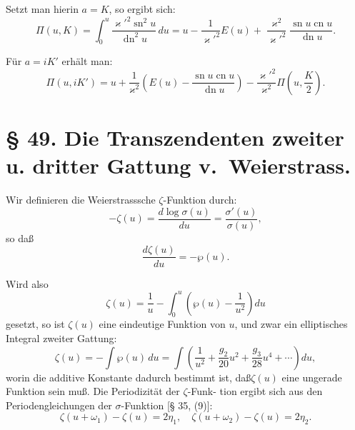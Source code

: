 \documentclass[12pt,a4paper]{article}
\theoremstyle{definition}
\begin{document}
Setzt man hierin $a = K$, so ergibt sich:
\begin{equation}\tag{8}
\Pi(u, K) = \int_0^u \frac{\varkappa'^2 \operatorname{sn}^2 u}{\operatorname{dn}^2 u} \, du = u - \frac{1}{\varkappa'^2}E(u) + \frac{\varkappa^2}{\varkappa'^2}\frac{\operatorname{sn} u \operatorname{cn} u}{\operatorname{dn} u}.
\end{equation}

F\"{u}r $a = iK'$ erh\"{a}lt man:
\begin{equation}\tag{9}
\Pi(u, iK') = u + \frac{1}{\varkappa^2}\left(E(u) - \frac{\operatorname{sn} u \operatorname{cn} u}{\operatorname{dn} u}\right) - \frac{\varkappa'^2}{\varkappa^2}\Pi\left(u, \frac{K}{2}\right).
\end{equation}

\section*{\S{} 49. Die Transzendenten zweiter u. dritter Gattung v.~Weierstrass.}

Wir definieren die Weierstrasssche $\zeta$-Funktion durch:
\begin{equation}\tag{1}
-\zeta(u) = \frac{d\log\sigma(u)}{du} = \frac{\sigma'(u)}{\sigma(u)},
\end{equation}
so da\ss
\begin{equation}\tag{2}
\frac{d\zeta(u)}{du} = -\wp(u).
\end{equation}

Wird also
\begin{equation}\tag{3}
\zeta(u) = \frac{1}{u} - \int_0^u \left(\wp(u) - \frac{1}{u^2}\right) du
\end{equation}
gesetzt, so ist $\zeta(u)$ eine eindeutige Funktion von $u$, und zwar ein
elliptisches Integral zweiter Gattung:
\begin{equation}\tag{4}
\zeta(u) = -\int \wp(u) \, du = \int \left(\frac{1}{u^2} + \frac{g_2}{20}u^2 + \frac{g_3}{28}u^4 + \cdots\right) du,
\end{equation}
worin die additive Konstante dadurch bestimmt ist, da\ss $\zeta(u)$
eine ungerade Funktion sein mu\ss. Die Periodizit\"{a}t der $\zeta$-Funk-
tion ergibt sich aus den Periodengleichungen der $\sigma$-Funktion
[\S{} 35, (9)]:
\begin{equation}\tag{5}
\zeta(u + \omega_1) - \zeta(u) = 2\eta_1, \quad
\zeta(u + \omega_2) - \zeta(u) = 2\eta_2.
\end{equation}
\end{document}

